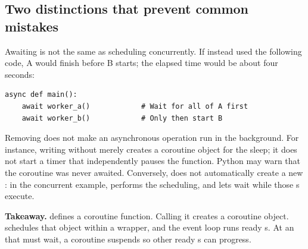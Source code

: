 \subsection{Two distinctions that prevent common mistakes}
Awaiting is not the same as scheduling concurrently. If  instead used the following code, A would finish before B starts; the elapsed time would be about four seconds:

\begin{lstlisting}[numbers=none]
async def main():
    await worker_a()            # Wait for all of A first
    await worker_b()            # Only then start B
\end{lstlisting}

Removing  does not make an asynchronous operation run in the background. For instance, writing  without  merely creates a coroutine object for the sleep; it does not start a timer that independently pauses the function. Python may warn that the coroutine was never awaited. Conversely,  does not automatically create a new : in the concurrent example,  performs the scheduling, and  lets  wait while those s execute.

\noindent\textbf{Takeaway.}  defines a coroutine function. Calling it creates a coroutine object.  schedules that object within a  wrapper, and the event loop runs ready s. At an  that must wait, a coroutine suspends so other ready s can progress.
